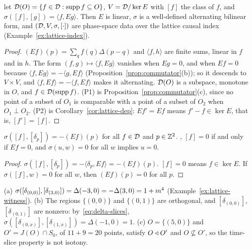 \begin{proposition}\label{prop:lattice-data}
 let $\mathcal D(O)=\{f\in\mathcal D:\operatorname{supp} f\subseteq O\}$, $V=\mathcal D/\ker E$ with $[f]$ the class of $f$, and
$\sigma([f],[g])=\langle f,Eg\rangle$. Then $E$ is linear, $\sigma$ is a well-defined alternating
bilinear form, and $(\mathcal D,V,\sigma,[\cdot])$ are phase-space data over the lattice causal index
(Example~\ref{ex:lattice-index}).
\end{proposition}
\begin{proof}
$(Ef)(p)=\sum_qf(q)\Delta(p-q)$ and $\langle f,h\rangle$ are finite sums, linear in $f$ and in $h$.
The form $(f,g)\mapsto\langle f,Eg\rangle$ vanishes when $Eg=0$, and when $Ef=0$ because
$\langle f,Eg\rangle=-\langle g,Ef\rangle$ (Proposition~\ref{prop:commutator}(b)); so it descends
to $V\times V$, and $\langle f,Ef\rangle=-\langle f,Ef\rangle$ makes it alternating. $\mathcal D(O)$ is a
subspace, monotone in $O$, and $f\in\mathcal D(\operatorname{supp} f)$. (P1) is Proposition~\ref{prop:commutator}(c),
since no point of a subset of $O_1$ is comparable with a point of a subset of $O_2$ when
$O_1\perp O_2$. (P2) is Corollary~\ref{cor:lattice-dep}: $Ef'=Ef$ means $f'-f\in\ker E$, that is,
$[f']=[f]$.
\end{proof}
\noindent{}

\begin{proposition}[Nondegeneracy]\label{prop:lattice-nondeg}
$\sigma([f],[\delta_p])=-(Ef)(p)$ for all $f\in\mathcal D$ and $p\in\mathbb Z^2$. , $[f]=0$ if
and only if $Ef=0$, and $\sigma(u,w)=0$ for all $w$ implies $u=0$.
\end{proposition}
\begin{proof}
$\sigma([f],[\delta_p])=-\langle\delta_p,Ef\rangle=-(Ef)(p)$. $[f]=0$ means $f\in\ker E$. If
$\sigma([f],w)=0$ for all $w$, then $(Ef)(p)=0$ for all $p$.
\end{proof}

\begin{example}\label{ex:lattice-nonvacuous}
(a) 
$\sigma([\delta_{(0,0)}],[\delta_{(3,0)}])=\Delta(-3,0)=-\Delta(3,0)=1+m^4$ (Example~\ref{ex:lattice-witness}).
(b) The regions $\{(0,0)\}$ and $\{(0,1)\}$ are orthogonal, and $[\delta_{(0,0)}]$, $[\delta_{(0,1)}]$
are nonzero: by~\eqref{eq:delta-slices}, $\sigma([\delta_{(0,x)}],[\delta_{(1,x)}])=\Delta(-1,0)=1$.
(c) $O=\{(5,0)\}$ and $O'=J(O)\cap S_0$, of $11+9=20$ points, satisfy $O\mathrel{\triangleleft} O'$ and
$O\not\subseteq O'$, so the time-slice property is not isotony.
\end{example}


